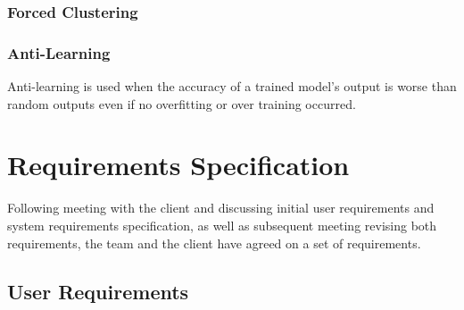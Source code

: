 \documentclass[titlepage]{article}
\begin{document}
\subsubsection*{Forced Clustering}
\subsubsection*{Anti-Learning}
Anti-learning is used when the accuracy of a trained model's output is worse than random outputs even if no overfitting or over training occurred.

\section{Requirements Specification}
Following meeting with the client and discussing initial user requirements and system requirements specification, as well as subsequent meeting revising both requirements, the team and the client have agreed on a set of requirements.

\subsection{User Requirements}
\end{document}
